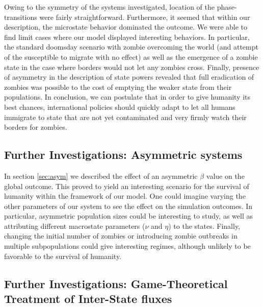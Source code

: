 \documentclass[11pt]{article} %
\begin{document}
Owing to the symmetry of the systems investigated, location of the phase-transitions were fairly straightforward. Furthermore, it seemed that within our description, the microstate behavior dominated the outcome. We were able to find limit cases where our model displayed interesting behaviors. In particular, the standard doomsday scenario with zombie overcoming the world (and attempt of the susceptible to migrate with no effect) as well as the emergence of a zombie state in the case where borders would not let any zombies cross. Finally, presence of asymmetry in the description of state powers revealed that full eradication of zombies was possible to the cost of emptying the weaker state from their populations. In conclusion, we can postulate that in order to give humanity its best chances, international policies should quickly adapt to let all humans immigrate to state that are not yet contaminated and very firmly watch their borders for zombies.
  
\subsection{Further Investigations: Asymmetric systems}\indent

In section \ref{sec:asym} we described the effect of an asymmetric $\beta$ value on the global outcome. This proved to yield an interesting scenario for the survival of humanity within the framework of our model. One could imagine varying the other parameters of our system to see the effect on the simulation outcomes. In particular, asymmetric population sizes could be interesting to study, as well as attributing different macrostate parameters ($\nu$ and $\eta$) to the states. Finally, changing the initial number of zombies or introducing zombie outbreaks in multiple subpopulations could give interesting regimes, although unlikely to be favorable to the survival of humanity.

\subsection{Further Investigations: Game-Theoretical Treatment of Inter-State fluxes}\indent
\label{sec:gt}
\end{document}
